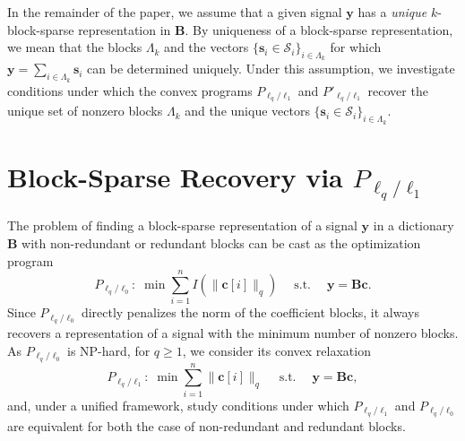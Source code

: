 \documentclass[10pt,twocolumn,twoside] {IEEEtran}
\begin{document}
{In the remainder of the paper, we assume that a given signal ${\boldsymbol{y}}$ has a \emph{unique} $k$-block-sparse representation in ${\boldsymbol{B}}$. By {uniqueness of a block-sparse representation}, we mean that the blocks $\Lambda_k$ and the vectors $\{ {\boldsymbol{s}}_i \in {\mathcal{S}}_i \}_{i \in \Lambda_k}$ for which ${\boldsymbol{y}} = \sum_{i \in \Lambda_k}{{\boldsymbol{s}}_i}$ can be determined uniquely. Under this assumption, we investigate conditions under which the convex programs  $P_{\ell_q/\ell_1}$ and $P'_{\ell_q/\ell_1}$ recover the unique set of nonzero blocks $\Lambda_k$ and the unique vectors $\{ {\boldsymbol{s}}_i \in {\mathcal{S}}_i \}_{i \in \Lambda_k}$.

\section{Block-Sparse Recovery via $P_{\ell_q/\ell_1}$}
\label{sec:L2L1}
The problem of finding a block-sparse representation of a signal ${\boldsymbol{y}}$ in a dictionary ${\boldsymbol{B}}$ with non-redundant or redundant blocks can be cast as the optimization program
\begin{equation*}
\label{eq:optL2L0G}
P_{\ell_q/\ell_0}: \; \min \sum_{i=1}^{n} I(\| {\boldsymbol{c}}[i] \|_q) \quad {\operatorname{s. t.}} \quad {\boldsymbol{y}} = {\boldsymbol{B}} {\boldsymbol{c}}.
\end{equation*}
Since $P_{\ell_q/\ell_0}$ directly penalizes the norm of the coefficient blocks, it always recovers a representation of a signal with the minimum number of nonzero blocks. 
As $P_{\ell_q/\ell_0}$ is NP-hard, for $q \geq 1$, we consider its convex relaxation
\begin{equation*}
\label{eq:optL2L1G}
P_{\ell_q/\ell_1}: \; \min \sum_{i=1}^{n} \| {\boldsymbol{c}}[i] \|_q \quad {\operatorname{s. t.}} \quad {\boldsymbol{y}} = {\boldsymbol{B}} {\boldsymbol{c}},
\end{equation*}
and, under a unified framework, study conditions under which $P_{\ell_q/\ell_1}$ and $P_{\ell_q/\ell_0}$ are equivalent for both the case of non-redundant and redundant blocks.

}
\end{document}

